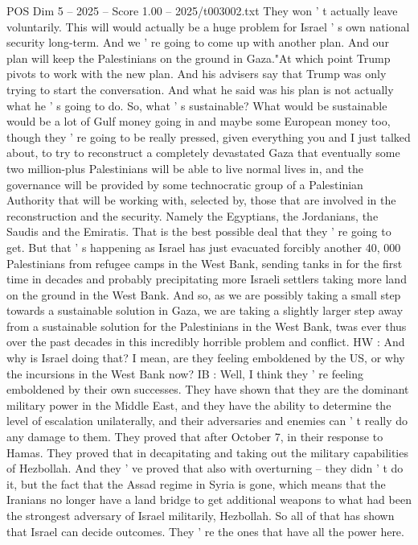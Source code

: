 \begin{textsample}{POS Dim 5 – 2025 – Score 1.00 – 2025/t003002.txt}
They won ' t actually leave voluntarily.
This will would actually be a huge problem for Israel ' s own national security long-term.
And we ' re going to come up with another plan.
And our plan will keep the Palestinians on the ground in Gaza."At which point Trump pivots to work with the new plan.
And his advisers say that Trump was only trying to start the conversation.
And what he said was his plan is not actually what he ' s going to do.
So, what ' s sustainable?
What would be sustainable would be a lot of Gulf money going in and maybe some European money too, though they ' re going to be really pressed, given everything you and I just talked about, to try to reconstruct a completely devastated Gaza that eventually some two million-plus Palestinians will be able to live normal lives in, and the governance will be provided by some technocratic group of a Palestinian Authority that will be working with, selected by, those that are involved in the reconstruction and the security.
Namely the Egyptians, the Jordanians, the Saudis and the Emiratis.
That is the best possible deal that they ' re going to get.
But that ' s happening as Israel has just evacuated forcibly another 40, 000 Palestinians from refugee camps in the West Bank, sending tanks in for the first time in decades and probably precipitating more Israeli settlers taking more land on the ground in the West Bank.
And so, as we are possibly taking a small step towards a sustainable solution in Gaza, we are taking a slightly larger step away from a sustainable solution for the Palestinians in the West Bank, twas ever thus over the past decades in this incredibly horrible problem and conflict.
HW : And why is Israel doing that?
I mean, are they feeling emboldened by the US, or why the incursions in the West Bank now?
IB : Well, I think they ' re feeling emboldened by their own successes.
They have shown that they are the dominant military power in the Middle East, and they have the ability to determine the level of escalation unilaterally, and their adversaries and enemies can ' t really do any damage to them.
They proved that after October 7, in their response to Hamas.
They proved that in decapitating and taking out the military capabilities of Hezbollah.
And they ' ve proved that also with overturning -- they didn ' t do it, but the fact that the Assad regime in Syria is gone, which means that the Iranians no longer have a land bridge to get additional weapons to what had been the strongest adversary of Israel militarily, Hezbollah.
So all of that has shown that Israel can decide outcomes.
They ' re the ones that have all the power here.

\end{textsample}
